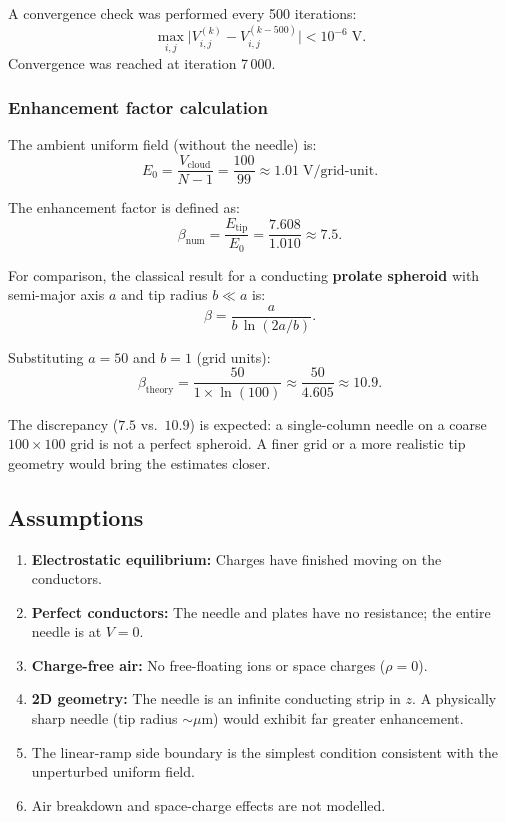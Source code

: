 \documentclass[11pt,a4paper]{article}
\begin{document}
A convergence check was performed every 500 iterations:
\begin{equation}
\max_{i,j} \bigl|V_{i,j}^{(k)} - V_{i,j}^{(k-500)}\bigr| < 10^{-6}\;\text{V}.
\end{equation}
Convergence was reached at iteration 7\,000.

\subsubsection{Enhancement factor calculation}

The ambient uniform field (without the needle) is:
\begin{equation}
E_0 = \frac{V_{\text{cloud}}}{N-1} = \frac{100}{99} \approx 1.01\;\text{V/grid-unit}.
\end{equation}

The enhancement factor is defined as:
\begin{equation}
\beta_{\text{num}} = \frac{E_{\text{tip}}}{E_0} = \frac{7.608}{1.010} \approx 7.5.
\end{equation}

For comparison, the classical result for a conducting \textbf{prolate spheroid} with semi-major axis $a$ and tip radius $b \ll a$ is:
\begin{equation}
\boxed{\;\beta = \frac{a}{b\,\ln(2a/b)}.\;}
\label{eq:beta_theory}
\end{equation}

Substituting $a = 50$ and $b = 1$ (grid units):
\begin{equation}
\beta_{\text{theory}} = \frac{50}{1 \times \ln(100)} \approx \frac{50}{4.605} \approx 10.9.
\end{equation}

The discrepancy ($7.5$ vs.\ $10.9$) is expected: a single-column needle on a coarse $100 \times 100$ grid is not a perfect spheroid. A finer grid or a more realistic tip geometry would bring the estimates closer.

\subsection{Assumptions}
\begin{enumerate}[leftmargin=2em]
\item \textbf{Electrostatic equilibrium:} Charges have finished moving on the conductors.
\item \textbf{Perfect conductors:} The needle and plates have no resistance; the entire needle is at $V=0$.
\item \textbf{Charge-free air:} No free-floating ions or space charges ($\rho = 0$).
\item \textbf{2D geometry:} The needle is an infinite conducting strip in $z$. A physically sharp needle (tip radius ${\sim}\mu$m) would exhibit far greater enhancement.
\item The linear-ramp side boundary is the simplest condition consistent with the unperturbed uniform field.
\item Air breakdown and space-charge effects are not modelled.
\end{enumerate}
\end{document}
